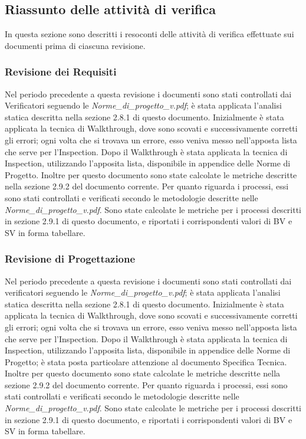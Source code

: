 \subsection{Riassunto delle attività di verifica}
In questa sezione sono descritti i resoconti delle attività di verifica effettuate sui documenti prima di ciascuna revisione.

\subsubsection{Revisione dei Requisiti}
Nel periodo precedente a questa revisione i documenti sono stati controllati dai Verificatori seguendo le \emph{Norme\_di\_progetto\_v\versioneNormeDiProgetto{}.pdf}; è stata applicata l'analisi statica descritta nella sezione 2.8.1 di questo documento.
Inizialmente è stata applicata la tecnica di Walkthrough, dove sono scovati e successivamente corretti gli errori; ogni volta che si trovava un errore, esso veniva messo nell'apposta lista che serve per l'Inspection.
Dopo il Walkthrough è stata applicata la tecnica di Inspection, utilizzando l'apposita lista, disponibile in appendice delle Norme di Progetto. Inoltre per questo documento sono state calcolate le metriche descritte nella sezione 2.9.2 del documento corrente.
Per quanto riguarda i processi, essi sono stati controllati e verificati secondo le metodologie descritte nelle  \emph{Norme\_di\_progetto\_v\versioneNormeDiProgetto{}.pdf}. Sono state calcolate le metriche per i processi descritti in sezione 2.9.1 di questo documento, e riportati i corrispondenti valori di BV e SV in forma tabellare.

\subsubsection{Revisione di Progettazione}
Nel periodo precedente a questa revisione i documenti sono stati controllati dai verificatori seguendo le \emph{Norme\_di\_progetto\_v\versioneNormeDiProgetto{}.pdf}; è stata applicata l'analisi statica descritta nella sezione 2.8.1 di questo documento.
Inizialmente è stata applicata la tecnica di Walkthrough, dove sono scovati e successivamente corretti gli errori; ogni volta che si trovava un errore, esso veniva messo nell'apposta lista che serve per l'Inspection.
Dopo il Walkthrough è stata applicata la tecnica di Inspection, utilizzando l'apposita lista, disponibile in appendice delle Norme di Progetto; è stata posta particolare attenzione al documento Specifica Tecnica. Inoltre per questo documento sono state calcolate le metriche descritte nella sezione 2.9.2 del documento corrente.
Per quanto riguarda i processi, essi sono stati controllati e verificati secondo le metodologie descritte nelle \emph{Norme\_di\_progetto\_v\versioneNormeDiProgetto{}.pdf}. Sono state calcolate le metriche per i processi descritti in sezione 2.9.1 di questo documento, e riportati i corrispondenti valori di BV e SV in forma tabellare.
